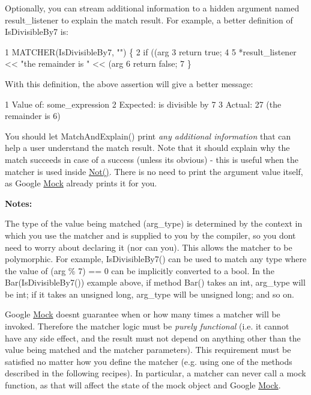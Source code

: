 Optionally, you can stream additional information to a hidden argument named {\ttfamily result\+\_\+listener} to explain the match result. For example, a better definition of {\ttfamily Is\+Divisible\+By7} is\+: 
\begin{DoxyCode}
1 MATCHER(IsDivisibleBy7, "") \{
2   if ((arg %
3     return true;
4 
5   *result\_listener << "the remainder is " << (arg %
6   return false;
7 \}
\end{DoxyCode}


With this definition, the above assertion will give a better message\+: 
\begin{DoxyCode}
1 Value of: some\_expression
2 Expected: is divisible by 7
3   Actual: 27 (the remainder is 6)
\end{DoxyCode}


You should let {\ttfamily Match\+And\+Explain()} print {\itshape any additional information} that can help a user understand the match result. Note that it should explain why the match succeeds in case of a success (unless it\textquotesingle{}s obvious) -\/ this is useful when the matcher is used inside {\ttfamily \hyperlink{namespacetesting_a3d7d0dda7e51b13fe2f5aa28e23ed6b6}{Not()}}. There is no need to print the argument value itself, as Google \hyperlink{classMock}{Mock} already prints it for you.

{\bfseries Notes\+:}


\begin{DoxyEnumerate}
\item The type of the value being matched ({\ttfamily arg\+\_\+type}) is determined by the context in which you use the matcher and is supplied to you by the compiler, so you don\textquotesingle{}t need to worry about declaring it (nor can you). This allows the matcher to be polymorphic. For example, {\ttfamily Is\+Divisible\+By7()} can be used to match any type where the value of {\ttfamily (arg \% 7) == 0} can be implicitly converted to a {\ttfamily bool}. In the {\ttfamily Bar(\+Is\+Divisible\+By7())} example above, if method {\ttfamily Bar()} takes an {\ttfamily int}, {\ttfamily arg\+\_\+type} will be {\ttfamily int}; if it takes an {\ttfamily unsigned long}, {\ttfamily arg\+\_\+type} will be {\ttfamily unsigned long}; and so on.
\end{DoxyEnumerate}
\begin{DoxyEnumerate}
\item Google \hyperlink{classMock}{Mock} doesn\textquotesingle{}t guarantee when or how many times a matcher will be invoked. Therefore the matcher logic must be {\itshape purely functional} (i.\+e. it cannot have any side effect, and the result must not depend on anything other than the value being matched and the matcher parameters). This requirement must be satisfied no matter how you define the matcher (e.\+g. using one of the methods described in the following recipes). In particular, a matcher can never call a mock function, as that will affect the state of the mock object and Google \hyperlink{classMock}{Mock}.
\end{DoxyEnumerate}

